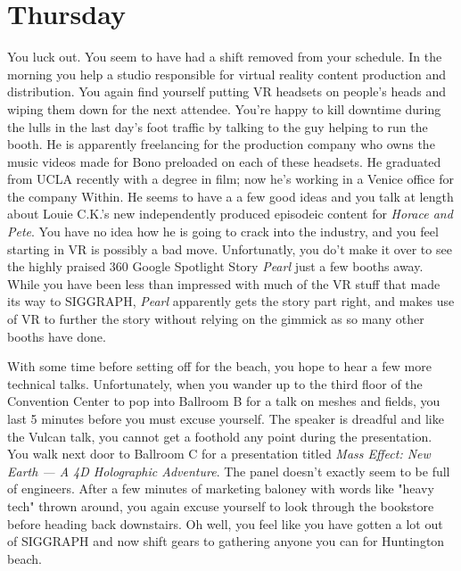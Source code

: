 \documentclass[../main.tex]{subfiles}
\begin{document}
\section{Thursday}

You luck out. You seem to have had a shift removed from your schedule. In the morning you help a studio responsible for virtual reality content production and distribution. You again find yourself putting VR headsets on people's heads and wiping them down for the next attendee. You're happy to kill downtime during the lulls in the last day's foot traffic by talking to the guy helping to run the booth. He is apparently freelancing for the production company who owns the music videos made for Bono preloaded on each of these headsets. He graduated from UCLA recently with a degree in film; now he's working in a Venice office for the company Within. He seems to have a a few good ideas and you talk at length about Louie C.K.'s new independently produced episodeic content for \textit{Horace and Pete}. You have no idea how he is going to crack into the industry, and you feel starting in VR is possibly a bad move. Unfortunatly, you do't make it over to see the highly praised 360 Google Spotlight Story \textit{Pearl} just a few booths away. While you have been less than impressed with much of the VR stuff that made its way to SIGGRAPH, \textit{Pearl} apparently gets the story part right, and makes use of VR to further the story without relying on the gimmick as so many other booths have done.

With some time before setting off for the beach, you hope to hear a few more technical talks. Unfortunately, when you wander up to the third floor of the Convention Center to pop into Ballroom B for a talk on meshes and fields, you last 5 minutes before you must excuse yourself. The speaker is dreadful and like the Vulcan talk, you cannot get a foothold any point during the presentation. You walk next door to Ballroom C for a presentation titled \textit{Mass Effect: New Earth --- A 4D Holographic Adventure}. The panel doesn't exactly seem to be full of engineers. After a few minutes of marketing baloney with words like "heavy tech" thrown around, you again excuse yourself to look through the bookstore before heading back downstairs. Oh well, you feel like you have gotten a lot out of SIGGRAPH and now shift gears to gathering anyone you can for Huntington beach.
\end{document}
